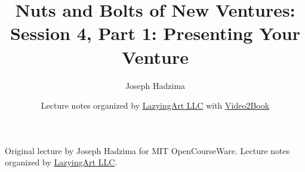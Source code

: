 \documentclass[11pt,oneside]{book}
\begin{document}
\frontmatter
\title{Nuts and Bolts of New Ventures: Session 4, Part 1: Presenting Your Venture}
\author{Joseph Hadzima}
\date{Lecture notes organized by \href{https://lazying.art}{LazyingArt LLC} with \href{https://github.com/lachlanchen/Video2Book}{Video2Book}}
\maketitle
\begin{center}
\small Original lecture by Joseph Hadzima for MIT OpenCourseWare. Lecture notes organized by \href{https://lazying.art}{LazyingArt LLC}.
\end{center}
\clearpage
\mainmatter

\end{document}
